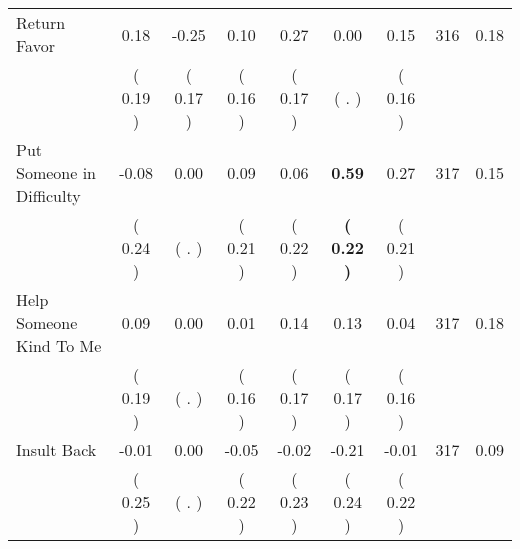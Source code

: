 \begin{tabular}{lcccccccc}
Return Favor &      0.18 &     -0.25 &      0.10 &      0.27 &      0.00 &      0.15 & 316 &       0.18 \\ 
 & (     0.19 ) & (     0.17 ) & (     0.16 ) & (     0.17 ) & (        . ) & (     0.16 ) & \\
Put Someone in Difficulty &     -0.08 &      0.00 &      0.09 &      0.06 & \textbf{     0.59} &      0.27 & 317 &       0.15 \\ 
 & (     0.24 ) & (        . ) & (     0.21 ) & (     0.22 ) & \textbf{(     0.22 )} & (     0.21 ) & \\
Help Someone Kind To Me &      0.09 &      0.00 &      0.01 &      0.14 &      0.13 &      0.04 & 317 &       0.18 \\ 
 & (     0.19 ) & (        . ) & (     0.16 ) & (     0.17 ) & (     0.17 ) & (     0.16 ) & \\
Insult Back &     -0.01 &      0.00 &     -0.05 &     -0.02 &     -0.21 &     -0.01 & 317 &       0.09 \\ 
 & (     0.25 ) & (        . ) & (     0.22 ) & (     0.23 ) & (     0.24 ) & (     0.22 ) & \\
\bottomrule
\end{tabular}
